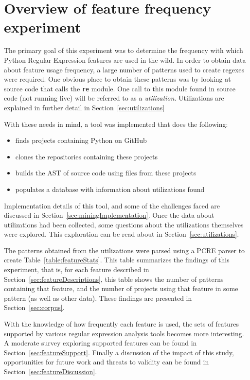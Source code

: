 \section{Overview of feature frequency experiment}

The primary goal of this experiment was to determine the frequency with which Python Regular Expression features are used in the wild.  In order to obtain data about feature usage frequency, a large number of patterns used to create regexes were required.  One obvious place to obtain these patterns was by looking at source code that calls the {\tt re} module.  One call to this module found in source code (not running live) will be referred to as a \emph{utilization}.  Utilizations are explained in further detail in Section~\ref{sec:utilizations}

With these needs in mind, a tool was implemented that does the following:
\begin{itemize} \itemsep -1pt
\item finds projects containing Python on GitHub
\item clones the repositories containing these projects
\item builds the AST of source code using files from these projects
\item populates a database with information about utilizations found
\end{itemize}

Implementation details of this tool, and some of the challenges faced are discussed in Section~\ref{sec:miningImplementation}.  Once the data about utilizations had been collected, some questions about the utilizations themselves were explored.  This exploration can be read about in Section~\ref{sec:utilizations}.

The patterns obtained from the utilizations were parsed using a PCRE parser to create Table~\ref{table:featureStats}.  This table summarizes the findings of this experiment, that is, for each feature described in Section~\ref{sec:featureDescriptions}, this table shows the number of patterns containing that feature, and the number of projects using that feature in some pattern (as well as other data).  These findings are presented in Section~\ref{sec:corpus}.

With the knowledge of how frequently each feature is used, the sets of features supported by various regular expression analysis tools becomes more interesting.  A moderate survey exploring supported features can be found in Section~\ref{sec:featureSupport}.  Finally a discussion of the impact of this study, opportunities for future work and threats to validity can be found in Section~\ref{sec:featureDiscussion}.
